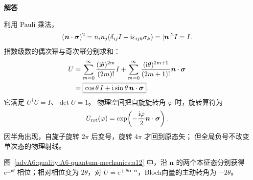 \begin{advsolution}
\begin{center}\begin{minipage}{.96\linewidth}\centering
\raggedright{\bfseries\color{DeepBlue}解答}\par\smallskip\centering

\label{advA6:quality:A6-quantum-mechanics:a12}
\end{minipage}\end{center}

利用 Pauli 乘法，
\[
 (\bm{n}\cdot\bm{\sigma})^2
 =n_in_j(\delta_{ij}I+\mathrm i\varepsilon_{ijk}\sigma_k)
 =|\bm{n}|^2I=I.
\]
指数级数的偶次幂与奇次幂分别求和：
\[
\begin{aligned}
 U&=\sum_{m=0}^\infty
 \frac{(\mathrm i\theta)^{2m}}{(2m)!}I
 +\sum_{m=0}^\infty
 \frac{(\mathrm i\theta)^{2m+1}}{(2m+1)!}
 \bm{n}\cdot\bm{\sigma}\\
 &=\boxed{\cos\theta\,I+
 \mathrm i\sin\theta\,\bm{n}\cdot\bm{\sigma}}.
\end{aligned}
\]
它满足 $U^\dagger U=I$、$\det U=1$。
物理空间把自旋旋转角 $\varphi$ 时，旋转算符为
\[
 U_{\rm rot}(\varphi)=
 \exp\!\left(-\frac{\mathrm i\varphi}{2}
 \bm{n}\cdot\bm{\sigma}\right).
\]
因半角出现，自旋子旋转 $2\pi$ 后变号，旋转 $4\pi$ 才回到原态矢；
但全局负号不改变单次态的物理射线。

图~\ref{advA6:quality:A6-quantum-mechanics:a12} 中，沿 $\boldsymbol n$ 的两个本征态分别获得 $e^{\pm\mathrm i\theta}$ 相位；相对相位变为 $2\theta$，对 $U=e^{+\mathrm i\theta\boldsymbol n\cdot\boldsymbol\sigma}$，Bloch向量的主动转角为 $-2\theta$。
\end{advsolution}

